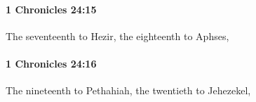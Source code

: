 		\paragraph{1 Chronicles 24:15} %
			\label{1CHRONICLES-24-15}

			The seventeenth to Hezir, the eighteenth to Aphses,


		\paragraph{1 Chronicles 24:16} %
			\label{1CHRONICLES-24-16}

			The nineteenth to Pethahiah, the twentieth to Jehezekel,


